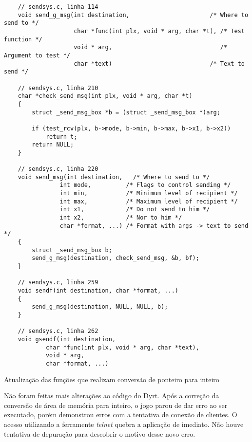 \begin{listing}[!ht]
    \begin{verbatim}
    // sendsys.c, linha 114
    void send_g_msg(int destination,                       /* Where to send to */
                    char *func(int plx, void * arg, char *t), /* Test function */
                    void * arg,                               /* Argument to test */
                    char *text)                            /* Text to send */
    
    // sendsys.c, linha 210
    char *check_send_msg(int plx, void * arg, char *t)
    {
        struct _send_msg_box *b = (struct _send_msg_box *)arg;

        if (test_rcv(plx, b->mode, b->min, b->max, b->x1, b->x2))
            return t;
        return NULL;
    }

    // sendsys.c, linha 220
    void send_msg(int destination,   /* Where to send to */
                int mode,          /* Flags to control sending */
                int min,           /* Minimum level of recipient */
                int max,           /* Maximum level of recipient */
                int x1,            /* Do not send to him */
                int x2,            /* Nor to him */
                char *format, ...) /* Format with args -> text to send */
    {
        struct _send_msg_box b;
        send_g_msg(destination, check_send_msg, &b, bf);
    }
    
    // sendsys.c, linha 259
    void sendf(int destination, char *format, ...)
    {
        send_g_msg(destination, NULL, NULL, b);
    }

    // sendsys.c, linha 262
    void gsendf(int destination,
            char *func(int plx, void * arg, char *text),
            void * arg,
            char *format, ...)
    \end{verbatim}
\caption{Atualização das funções que realizam conversão de ponteiro para inteiro}
\label{lst:convertionErrorFix}
\end{listing}

Não foram feitas mais alterações ao código do Dyrt. Após a correção da conversão de área de memória para 
inteiro, o jogo parou de dar erro ao ser executado, porém demonstrou erros com a tentativa de conexão de 
clientes. O acesso utilizando a ferramente \textit{telnet} quebra a aplicação de imediato. Não houve 
tentativa de depuração para descobrir o motivo desse novo erro.